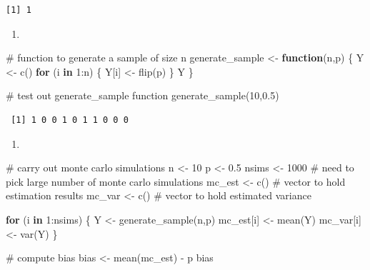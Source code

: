 \documentclass[
  letterpaper,
  DIV=11,
  numbers=noendperiod]{scrreprt}
\newenvironment{Shaded}{\begin{snugshade}}{\end{snugshade}}
\newcommand{\CommentTok}[1]{\textcolor[rgb]{0.37,0.37,0.37}{#1}}
\newcommand{\ControlFlowTok}[1]{\textcolor[rgb]{0.00,0.23,0.31}{\textbf{#1}}}
\newcommand{\DecValTok}[1]{\textcolor[rgb]{0.68,0.00,0.00}{#1}}
\newcommand{\FloatTok}[1]{\textcolor[rgb]{0.68,0.00,0.00}{#1}}
\newcommand{\FunctionTok}[1]{\textcolor[rgb]{0.28,0.35,0.67}{#1}}
\newcommand{\NormalTok}[1]{\textcolor[rgb]{0.00,0.23,0.31}{#1}}
\newcommand{\OtherTok}[1]{\textcolor[rgb]{0.00,0.23,0.31}{#1}}
\newcommand{\SpecialCharTok}[1]{\textcolor[rgb]{0.37,0.37,0.37}{#1}}
\providecommand{\tightlist}{%
  \setlength{\itemsep}{0pt}\setlength{\parskip}{0pt}}\usepackage{longtable,booktabs,array}
\begin{document}
\begin{verbatim}
[1] 1
\end{verbatim}

\begin{enumerate}
\def\labelenumi{\arabic{enumi}.}
\setcounter{enumi}{1}
\tightlist
\item
\end{enumerate}

\begin{Shaded}
\begin{Highlighting}[]
\CommentTok{\# function to generate a sample of size n}
\NormalTok{generate\_sample }\OtherTok{\textless{}{-}} \ControlFlowTok{function}\NormalTok{(n,p) \{}
\NormalTok{  Y }\OtherTok{\textless{}{-}} \FunctionTok{c}\NormalTok{()}
  \ControlFlowTok{for}\NormalTok{ (i }\ControlFlowTok{in} \DecValTok{1}\SpecialCharTok{:}\NormalTok{n) \{}
\NormalTok{    Y[i] }\OtherTok{\textless{}{-}} \FunctionTok{flip}\NormalTok{(p)}
\NormalTok{  \}}
\NormalTok{  Y}
\NormalTok{\}}

\CommentTok{\# test out generate\_sample function}
\FunctionTok{generate\_sample}\NormalTok{(}\DecValTok{10}\NormalTok{,}\FloatTok{0.5}\NormalTok{)}
\end{Highlighting}
\end{Shaded}

\begin{verbatim}
 [1] 1 0 0 1 0 1 1 0 0 0
\end{verbatim}

\begin{enumerate}
\def\labelenumi{\arabic{enumi}.}
\setcounter{enumi}{2}
\tightlist
\item
\end{enumerate}

\begin{Shaded}
\begin{Highlighting}[]
\CommentTok{\# carry out monte carlo simulations}
\NormalTok{n }\OtherTok{\textless{}{-}} \DecValTok{10}
\NormalTok{p }\OtherTok{\textless{}{-}} \FloatTok{0.5}
\NormalTok{nsims }\OtherTok{\textless{}{-}} \DecValTok{1000}  \CommentTok{\# need to pick large number of monte carlo simulations}
\NormalTok{mc\_est }\OtherTok{\textless{}{-}} \FunctionTok{c}\NormalTok{()  }\CommentTok{\# vector to hold estimation results}
\NormalTok{mc\_var }\OtherTok{\textless{}{-}} \FunctionTok{c}\NormalTok{()  }\CommentTok{\# vector to hold estimated variance}

\ControlFlowTok{for}\NormalTok{ (i }\ControlFlowTok{in} \DecValTok{1}\SpecialCharTok{:}\NormalTok{nsims) \{}
\NormalTok{  Y }\OtherTok{\textless{}{-}} \FunctionTok{generate\_sample}\NormalTok{(n,p)}
\NormalTok{  mc\_est[i] }\OtherTok{\textless{}{-}} \FunctionTok{mean}\NormalTok{(Y)}
\NormalTok{  mc\_var[i] }\OtherTok{\textless{}{-}} \FunctionTok{var}\NormalTok{(Y)}
\NormalTok{\}}

\CommentTok{\# compute bias}
\NormalTok{bias }\OtherTok{\textless{}{-}} \FunctionTok{mean}\NormalTok{(mc\_est) }\SpecialCharTok{{-}}\NormalTok{ p}
\NormalTok{bias}
\end{Highlighting}
\end{Shaded}
\end{document}

